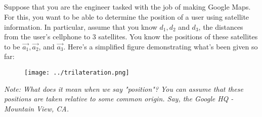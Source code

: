 \\ \\
\\ \\
Suppose that you are the engineer tasked with the job of making Google Maps. For this, you want to be able to determine the position of a user using satellite information. In particular, assume that you know $d_1, d_2$ and $d_3$, the distances from the user's cellphone to 3 satellites. You know the positions of these satellites to be $\vec{a_1}, \vec{a_2}$, and $\vec{a_3}$. Here's a simplified figure demonstrating what's been given so far:

\begin{figure}[H]
    \centering
    \texttt{[image: ../trilateration.png]}
\end{figure}

\textit{Note: What does it mean when we say "position"? You can assume that these positions are taken relative to some common origin. Say, the Google HQ - Mountain View, CA.}

